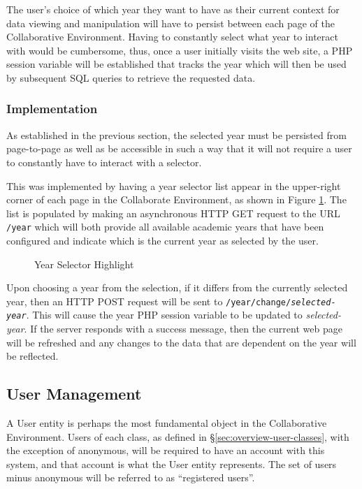 The user's choice of which year they want to have as their current context for data viewing and manipulation will have to persist between each page of the Collaborative Environment. Having to constantly select what year to interact with would be cumbersome, thus, once a user initially visits the web site, a PHP session variable will be established that tracks the year which will then be used by subsequent SQL queries to retrieve the requested data.

\subsubsection{Implementation}
As established in the previous section, the selected year must be persisted from page-to-page as well as be accessible in such a way that it will not require a user to constantly have to interact with a selector.

This was implemented by having a year selector list appear in the upper-right corner of each page in the Collaborate Environment, as shown in Figure \ref{fig:screens-year}. The list is populated by making an asynchronous HTTP GET request to the URL \texttt{/year} which will both provide all available academic years that have been configured and indicate which is the current year as selected by the user.

\begin{figure}[h!]
	\centering
	\caption{Year Selector Highlight}
	\label{fig:screens-year}
\end{figure}

Upon choosing a year from the selection, if it differs from the currently selected year, then an HTTP POST request will be sent to \texttt{/year/change/\textit{selected-year}}. This will cause the year PHP session variable to be updated to \emph{selected-year}. If the server responds with a success message, then the current web page will be refreshed and any changes to the data that are dependent on the year will be reflected.

\subsection{User Management}
\label{subsec:design-user}
A User entity is perhaps the most fundamental object in the Collaborative Environment.  Users of each class, as defined in \S \ref{sec:overview-user-classes}, with the exception of anonymous, will be required to have an account with this system, and that account is what the User entity represents. The set of users minus anonymous will be referred to as ``registered users''.

